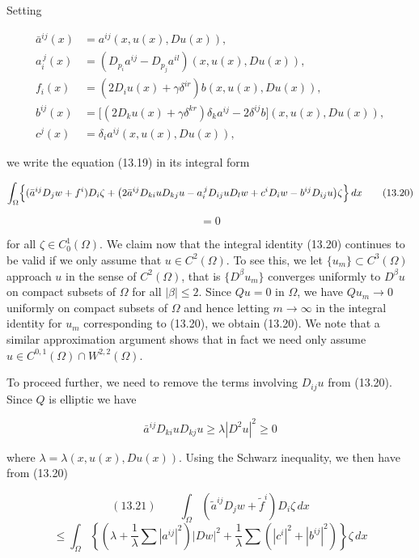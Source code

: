 Setting

\[
\begin{aligned}
\bar a^{ij}(x)&=a^{ij}(x,u(x),Du(x)),\\
a_i^{\,j}(x)&=(D_{p_i}a^{ij}-D_{p_j}a^{il})(x,u(x),Du(x)),\\
f_i(x)&=(2D_iu(x)+\gamma\delta^{ir})b(x,u(x),Du(x)),\\
b^{ij}(x)&=\bigl[(2D_ku(x)+\gamma\delta^{kr})\delta_k a^{ij}-2\delta^{ij}b\bigr](x,u(x),Du(x)),\\
c^j(x)&=\delta_i a^{ij}(x,u(x),Du(x)),
\end{aligned}
\]

we write the equation (13.19) in its integral form

\begin{equation}
\int_\Omega \Bigl\{(\bar a^{ij}D_jw+f^i)D_i\zeta+\bigl(2\bar a^{ij}D_{ki}uD_{kj}u-a_i^{\,j}D_{ij}uD_lw+c^iD_iw-b^{ij}D_{ij}u\bigr)\zeta\Bigr\}\,dx
\tag{13.20}
\end{equation}

\[
=0
\]

for all $\zeta\in C_0^1(\Omega)$. We claim now that the integral identity (13.20) continues to be valid if we only assume that $u\in C^2(\Omega)$. To see this, we let $\{u_m\}\subset C^3(\Omega)$ approach $u$ in the sense of $C^2(\Omega)$, that is $\{D^\beta u_m\}$ converges uniformly to $D^\beta u$ on compact subsets of $\Omega$ for all $|\beta|\leq 2$. Since $Qu=0$ in $\Omega$, we have $Qu_m\to 0$ uniformly on compact subsets of $\Omega$ and hence letting $m\to\infty$ in the integral identity for $u_m$ corresponding to (13.20), we obtain (13.20). We note that a similar approximation argument shows that in fact we need only assume $u\in C^{0,1}(\Omega)\cap W^{2,2}(\Omega)$.

To proceed further, we need to remove the terms involving $D_{ij}u$ from (13.20).
Since $Q$ is elliptic we have

\[
\bar a^{ij}D_{ki}uD_{kj}u\geq \lambda|D^2u|^2\geq 0
\]

where $\lambda=\lambda(x,u(x),Du(x))$. Using the Schwarz inequality, we then have from (13.20)




\[
(13.21)\qquad \int_{\Omega} (\tilde a^{ij}D_j w + \tilde f^i)D_i\zeta \, dx
\]
\[
\leq \int_{\Omega} \left\{\left(\lambda + \frac{1}{\lambda}\sum |a^{ij}|^2\right)|Dw|^2 + \frac{1}{\lambda}\sum \left(|c^i|^2 + |b^{ij}|^2\right)\right\}\zeta \, dx
\]

